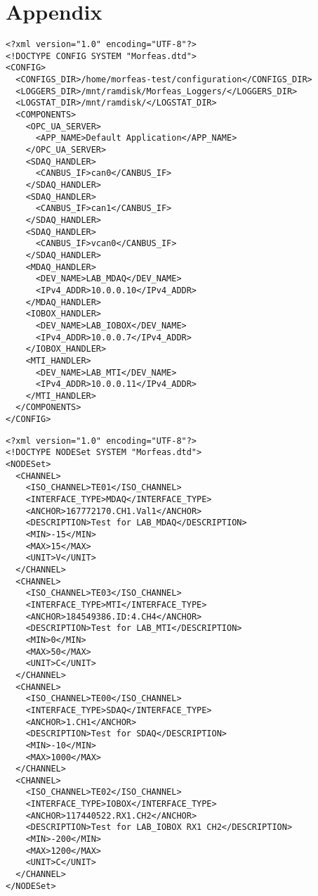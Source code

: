 \section{Appendix}
\begin{lstlisting}[frame=single,caption=Example of Morfeas\_config.xml,label=lst:Morfeas_config.xml]
<?xml version="1.0" encoding="UTF-8"?>
<!DOCTYPE CONFIG SYSTEM "Morfeas.dtd">
<CONFIG>
  <CONFIGS_DIR>/home/morfeas-test/configuration</CONFIGS_DIR>
  <LOGGERS_DIR>/mnt/ramdisk/Morfeas_Loggers/</LOGGERS_DIR>
  <LOGSTAT_DIR>/mnt/ramdisk/</LOGSTAT_DIR>
  <COMPONENTS>
    <OPC_UA_SERVER>
      <APP_NAME>Default Application</APP_NAME>
    </OPC_UA_SERVER>
    <SDAQ_HANDLER>
      <CANBUS_IF>can0</CANBUS_IF>
    </SDAQ_HANDLER>
    <SDAQ_HANDLER>
      <CANBUS_IF>can1</CANBUS_IF>
    </SDAQ_HANDLER>
	<SDAQ_HANDLER>
      <CANBUS_IF>vcan0</CANBUS_IF>
    </SDAQ_HANDLER>
    <MDAQ_HANDLER>
      <DEV_NAME>LAB_MDAQ</DEV_NAME>
      <IPv4_ADDR>10.0.0.10</IPv4_ADDR>
    </MDAQ_HANDLER>
    <IOBOX_HANDLER>
      <DEV_NAME>LAB_IOBOX</DEV_NAME>
      <IPv4_ADDR>10.0.0.7</IPv4_ADDR>
    </IOBOX_HANDLER>
    <MTI_HANDLER>
      <DEV_NAME>LAB_MTI</DEV_NAME>
      <IPv4_ADDR>10.0.0.11</IPv4_ADDR>
    </MTI_HANDLER>
  </COMPONENTS>
</CONFIG>
\end{lstlisting}
\newpage
\begin{lstlisting}[frame=single,caption=Example of OPC\_UA\_Config.xml,label=lst:OPC_UA_Config.xml]
<?xml version="1.0" encoding="UTF-8"?>
<!DOCTYPE NODESet SYSTEM "Morfeas.dtd">
<NODESet>
  <CHANNEL>
    <ISO_CHANNEL>TE01</ISO_CHANNEL>
    <INTERFACE_TYPE>MDAQ</INTERFACE_TYPE>
    <ANCHOR>167772170.CH1.Val1</ANCHOR>
    <DESCRIPTION>Test for LAB_MDAQ</DESCRIPTION>
    <MIN>-15</MIN>
    <MAX>15</MAX>
    <UNIT>V</UNIT>
  </CHANNEL>
  <CHANNEL>
    <ISO_CHANNEL>TE03</ISO_CHANNEL>
    <INTERFACE_TYPE>MTI</INTERFACE_TYPE>
    <ANCHOR>184549386.ID:4.CH4</ANCHOR>
    <DESCRIPTION>Test for LAB_MTI</DESCRIPTION>
    <MIN>0</MIN>
    <MAX>50</MAX>
    <UNIT>C</UNIT>
  </CHANNEL>
  <CHANNEL>
    <ISO_CHANNEL>TE00</ISO_CHANNEL>
    <INTERFACE_TYPE>SDAQ</INTERFACE_TYPE>
    <ANCHOR>1.CH1</ANCHOR>
    <DESCRIPTION>Test for SDAQ</DESCRIPTION>
    <MIN>-10</MIN>
    <MAX>1000</MAX>
  </CHANNEL>
  <CHANNEL>
    <ISO_CHANNEL>TE02</ISO_CHANNEL>
    <INTERFACE_TYPE>IOBOX</INTERFACE_TYPE>
    <ANCHOR>117440522.RX1.CH2</ANCHOR>
    <DESCRIPTION>Test for LAB_IOBOX RX1 CH2</DESCRIPTION>
    <MIN>-200</MIN>
    <MAX>1200</MAX>
    <UNIT>C</UNIT>
  </CHANNEL>
</NODESet>
\end{lstlisting}
\newpage
\begin{tree_box}[label=tree:OPC_UA_nodeset, title=Morfeas OPC-UA Nodeset]
\end{tree_box}
